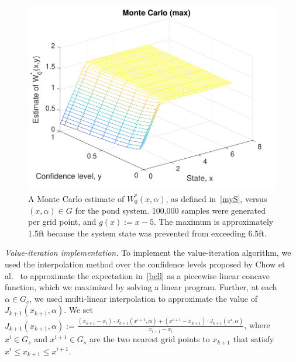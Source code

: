 \documentclass[letterpaper, 10 pt, conference]{ieeeconf}  %
\begin{document}
\begin{figure}[thpb]
      \centering
      \includegraphics[scale=0.5]{monte_carlo_max_sept112018.pdf}
      \vspace{-1em}
      \caption{A Monte Carlo estimate of $W_0^*(x,\alpha)$, as defined in~\eqref{myS}, versus $(x, \alpha) \in G$ for the pond system.
	  100,000 samples were generated per grid point, and $g(x) := x - 5$. 
	  The maximum is approximately 1.5ft because the system state was prevented from exceeding 6.5ft.}
      \label{W0mc}
\end{figure}

\textit{Value-iteration implementation.} To implement the value-iteration algorithm, we used the interpolation method over the confidence levels proposed by Chow et al.~\cite{chow2015risk} 
to approximate the expectation in~\eqref{bell} as a piecewise linear concave function, which we maximized by solving a linear program.
Further, at each $\alpha \in G_c$, we used multi-linear interpolation to approximate the value of $J_{k+1}(x_{k+1}, \alpha)$. We set $J_{k+1}(x_{k+1}, \alpha) := \frac{(x_{k+1} - x_i) \cdot J_{k+1}(x^{i+1}, \alpha) + (x^{i+1} - x_{k+1})  \cdot J_{k+1}(x^i, \alpha)}{x_{i+1}-x_i}$,
where $x^i \in G_s$ and $x^{i+1} \in G_s$ are the two nearest grid points to $x_{k+1}$ that satisfy $x^i \leq x_{k+1} \leq x^{i+1}$.
\end{document}
